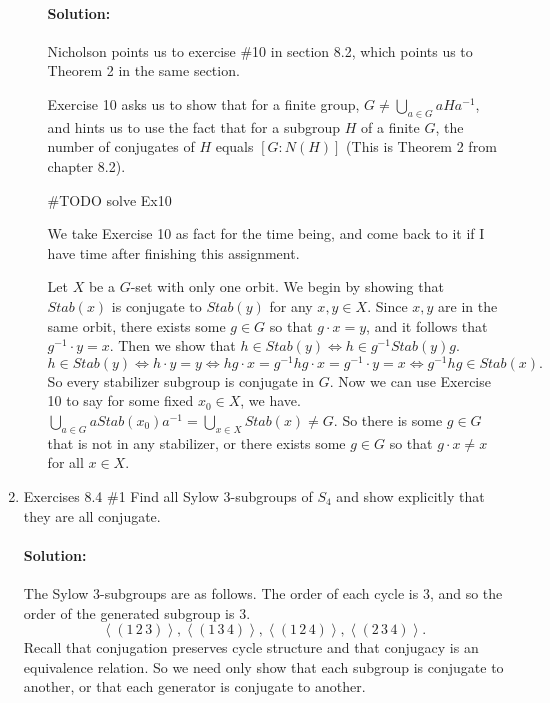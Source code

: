 \documentclass{article}
\begin{document}
\begin{enumerate}
\begin{enumerate}
    \paragraph{Solution: }
    Nicholson points us to exercise \#10 in section 8.2, which points us to Theorem 2 in the same section.

    Exercise 10 asks us to show that for a finite group, $G\neq\bigcup_{a\in G}aHa^{-1}$, and hints us to use the fact that for a subgroup $H$ of a finite $G$,
    the number of conjugates of $H$ equals $[G:N(H)]$ (This is Theorem 2 from chapter 8.2).

    #TODO solve Ex10

    We take Exercise 10 as fact for the time being, and come back to it if I have time after finishing this assignment.

    Let $X$ be a $G$-set with only one orbit. We begin by showing that  $Stab(x)$ is conjugate to $Stab(y)$ for any $x,y\in X$.
    Since $x,y$ are in the same orbit, there exists some $g\in G$ so that $g\cdot x=y$, and it follows that $g^{-1}\cdot y=x$.
    Then we show that $h\in Stab(y)\iff h\in g^{-1}Stab(y)g$.
    \[
    h\in Stab(y)\iff h\cdot y=y\iff hg\cdot x= g^{-1}hg\cdot x=g^{-1}\cdot y=x\iff g^{-1}hg\in Stab(x)
    .\] 
    So every stabilizer subgroup is conjugate in $G$. Now we can use Exercise 10 to say for some fixed $x_0\in X$, we have.
    $\bigcup_{a\in G} aStab(x_0)a^{-1}=\bigcup_{x\in X} Stab(x)\neq G$. So there is some $g\in G$ that is not in any stabilizer, or
    there exists some $g\in G$ so that $g\cdot x\neq x$ for all $x\in X$.

\end{enumerate}
\item Exercises 8.4 \#1 Find all Sylow $3$-subgroups of $S_4$ and show explicitly that they are all conjugate.

    \paragraph{Solution: }
    The Sylow 3-subgroups are as follows. The order of each cycle is 3, and so the order
    of the generated subgroup is 3.
    \[ \left<(1\,2\,3)\right>,\left<(1\,3\,4)\right>,\left<(1\,2\,4)\right>,\left<(2\,3\,4)\right> .\] 
    Recall that conjugation preserves cycle structure and that conjugacy is an equivalence relation. 
    So we need only show that each subgroup is conjugate to another, or that each generator is conjugate to another.


\end{enumerate}
\end{document}

